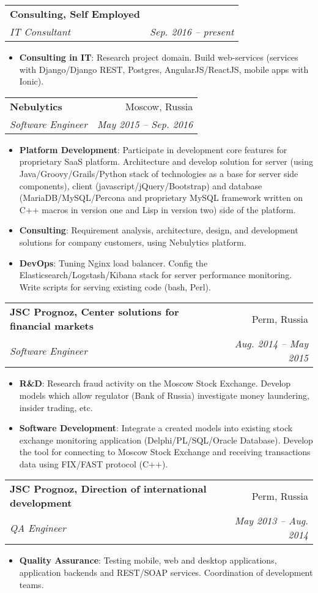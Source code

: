 \documentclass[letterpaper,11pt]{article}
\makeatletter
\newcommand{\resumeItem}[2]{
  \item\small{
    \textbf{#1}{: #2 \vspace{-2pt}}
  }
}
\newcommand{\resumeSubheading}[4]{
  \vspace{-1pt}\item
    \begin{tabular*}{0.97\textwidth}{l@{\extracolsep{\fill}}r}
      \textbf{#1} & #2 \\
      \textit{\small#3} & \textit{\small #4} \\
    \end{tabular*}\vspace{-5pt}
}
\newcommand{\resumeItemListStart}{\begin{itemize}}
\newcommand{\resumeItemListEnd}{\end{itemize}\vspace{-5pt}}
\makeatother
\begin{document}
    \resumeSubheading
      {Consulting, Self Employed}{}
      {IT Consultant}{Sep. 2016 -- present}
      \resumeItemListStart
        \resumeItem{Consulting in IT}
          {Research project domain. Build web-services (services with Django/Django REST, Postgres, AngularJS/ReactJS, mobile apps with Ionic).}
    \resumeItemListEnd

    \resumeSubheading
      {Nebulytics}{Moscow, Russia}
      {Software Engineer}{May 2015 -- Sep. 2016}
      \resumeItemListStart
        \resumeItem{Platform Development}
          {Participate in development core features for proprietary SaaS platform. Architecture and develop solution for server (using Java/Groovy/Grails/Python stack of technologies as a base for server side components), client (javascript/jQuery/Bootstrap) and database (MariaDB/MySQL/Percona and proprietary MySQL framework written on C++ macros in version one and Lisp in version two) side of the platform.}
        \resumeItem{Consulting}
          {Requirement analysis, architecture, design, and development solutions for company customers, using Nebulytics platform.}
        \resumeItem{DevOps}
          {Tuning Nginx load balancer. Config the Elasticsearch/Logstash/Kibana stack for server performance monitoring. Write scripts for serving existing code (bash, Perl).}
      \resumeItemListEnd

    \resumeSubheading
      {JSC Prognoz, Center solutions for financial markets}{Perm, Russia}
      {Software Engineer}{Aug. 2014 -- May 2015}
      \resumeItemListStart
        \resumeItem{R\&D}
          {Research fraud activity on the Moscow Stock Exchange. Develop models which allow regulator (Bank of Russia) investigate money laundering, insider trading, etc.}
        \resumeItem{Software Development}
          {Integrate a created models into existing stock exchange monitoring application (Delphi/PL/SQL/Oracle Database). Develop the tool for connecting to Moscow Stock Exchange and receiving transactions data using FIX/FAST protocol (C++).}
      \resumeItemListEnd

    \resumeSubheading
      {JSC Prognoz, Direction of international development}{Perm, Russia}
      {QA Engineer}{May 2013 -- Aug. 2014}
      \resumeItemListStart
        \resumeItem{Quality Assurance}
          {Testing mobile, web and desktop applications, application backends and REST/SOAP services. Coordination of development teams.}
      \resumeItemListEnd
\end{document}
